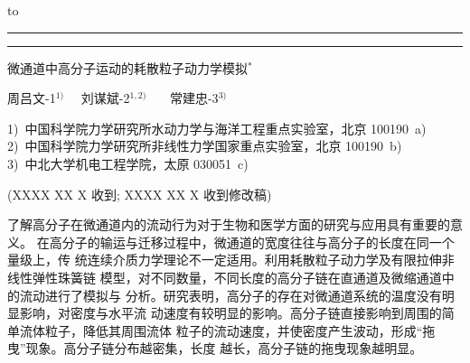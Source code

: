 \documentclass[twoside,12pt]{article}
\begin{document}
\def\sectionformat{\normalfont\Large} %
\def\subsectionformat{\normalfont\large}
\def\subsubsectionformat{\normalfont\normalsize}
\thispagestyle{empty} \vspace*{0.8cm}\hbox
to
\par\noindent\rule[3mm]{\textwidth}{0.2pt}\hspace*{-\textwidth}\noindent
\rule[2.5mm]{\textwidth}{0.2pt}

\renewcommand\figurename{\small 图}
\renewcommand{\captionlabeldelim}{~}


\begin{center}
\Large 微通道中高分子运动的耗散粒子动力学模拟$^{*}$
\end{center}

\begin{center}
{ 周吕文-1$^{1)}$ \ \ 刘谋斌-2$^{1,2)}$ \ \
\ 常建忠-3$^{3)}$ }
\end{center}

\begin{center}
\begin{footnotesize}
1)\ 中国科学院力学研究所水动力学与海洋工程重点实验室，北京 100190\ a) \\
2)\ 中国科学院力学研究所非线性力学国家重点实验室，北京 100190\ b) \\
3)\ 中北大学机电工程学院，太原 030051\ c)
\end{footnotesize}
\end{center}

\begin{center}
\footnotesize (XXXX XX X 收到; XXXX XX X 收到修改稿)
\end{center}

\vspace*{2mm}

\begin{center}
\begin{minipage}{15.5cm}
\parindent 20pt\footnotesize
了解高分子在微通道内的流动行为对于生物和医学方面的研究与应用具有重要的意义。
在高分子的输运与迁移过程中，微通道的宽度往往与高分子的长度在同一个量级上，传
统连续介质力学理论不一定适用。利用耗散粒子动力学及有限拉伸非线性弹性珠簧链
模型，对不同数量，不同长度的高分子链在直通道及微缩通道中的流动进行了模拟与
分析。研究表明，高分子的存在对微通道系统的温度没有明显影响，对密度与水平流
动速度有较明显的影响。高分子链直接影响到周围的简单流体粒子，降低其周围流体
粒子的流动速度，并使密度产生波动，形成``拖曳''现象。高分子链分布越密集，长度
越长，高分子链的拖曳现象越明显。
\end{minipage}
\end{center}
\end{document}
